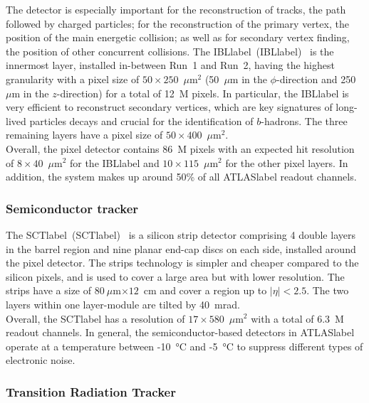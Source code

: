 The detector is especially important for the reconstruction of tracks, the path followed by charged particles; for the reconstruction of the primary vertex, the position of the main energetic collision; as well as for secondary vertex finding, the position of other concurrent collisions. The \acrlong{IBLlabel}~(\acrshort{IBLlabel})~\cite{Capeans:1291633} is the innermost layer, installed in-between Run~1 and Run~2, having the highest granularity with a pixel size of $50\times 250$~$\mu$m$^2$ (50~$\mu$m in the $\phi$-direction and 250~$\mu$m in the $z$-direction) for a total of 12~M pixels. In particular, the \acrshort{IBLlabel} is very efficient to reconstruct secondary vertices, which are key signatures of long-lived particles decays and crucial for the identification of $b$-hadrons. The three remaining layers have a pixel size of $50\times 400$~$\mu$m$^2$.\\

Overall, the pixel detector contains 86~M pixels with an expected hit resolution of $8\times 40$~$\mu$m$^2$ for the \acrshort{IBLlabel} and $10\times 115$~$\mu$m$^2$ for the other pixel layers. In addition, the system makes up around 50\% of all \acrshort{ATLASlabel} readout channels.

\subsubsection*{Semiconductor tracker}

The \acrlong{SCTlabel}~(\acrshort{SCTlabel})~\cite{HABER1998161,SCTperformance} is a silicon strip detector comprising 4 double layers in the barrel region and nine planar end-cap discs on each side, installed around the pixel detector. The strips technology is simpler and cheaper compared to the silicon pixels, and is used to cover a large area but with lower resolution. The strips have a size of $80~\mu$m$\times 12$~cm and cover a region up to $|\eta|<2.5$. The two layers within one layer-module are tilted by 40~mrad.\\

Overall, the \acrshort{SCTlabel} has a resolution of $17\times 580$~$\mu$m$^2$ with a total of 6.3~M readout channels. In general, the semiconductor-based detectors in \acrshort{ATLASlabel} operate at a temperature between -10~°C and -5~°C to suppress different types of electronic noise.


\subsubsection*{Transition Radiation Tracker}

